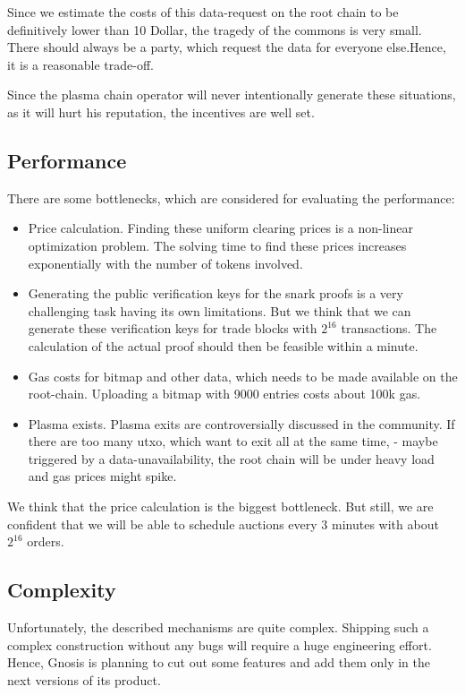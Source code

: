 \documentclass[11pt,parskip=full]{scrartcl}%
\begin{document}
Since we estimate the costs of this data-request on the root chain to be definitively lower than 10 Dollar, the tragedy of the commons is very small. 
There should always be a party, which request the data for everyone else.Hence, it is a reasonable trade-off. 

Since the plasma chain operator will never intentionally generate these situations, as it will hurt his reputation, the incentives are well set. 

\subsection{Performance}
There are some bottlenecks, which are considered for evaluating the performance:
\begin{itemize}
\item Price calculation. 
Finding these uniform clearing prices is a non-linear optimization problem. 
The solving time to find these prices increases exponentially with the number of tokens involved. 
\item Generating the public verification keys for the snark proofs is a very challenging task having its own limitations. 
But we think that we can generate these verification keys for trade blocks with $2^{16}$ transactions. 
The calculation of the actual proof should then be feasible within a minute. 
\item Gas costs for bitmap and other data, which needs to be made available on the root-chain. 
Uploading a bitmap with 9000 entries costs about 100k gas. 
\item Plasma exists.
Plasma exits are controversially discussed in the community. 
If there are too many utxo, which want to exit all at the same time, - maybe triggered by a data-unavailability, the root chain will be under heavy load and gas prices might spike. 
\end{itemize}
We think that the price calculation is the biggest bottleneck. 
But still, we are confident that we will be able to schedule auctions every 3 minutes with about $2^{16}$ orders. 
\subsection{Complexity}
Unfortunately, the described mechanisms are quite complex. 
Shipping such a complex construction without any bugs will require a huge engineering effort. 
Hence, Gnosis is planning to cut out some features and add them only in the next versions of its product. 
\end{document}
